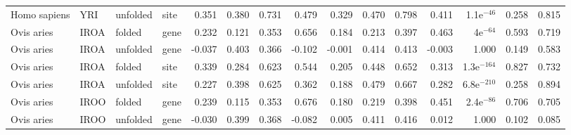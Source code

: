 \begin{longtable}{llllrrrrrrrrrrr}
        Homo sapiens &                       YRI &  unfolded &  site &                              0.351 &                               0.380 &                 0.731 &                 0.479 &                              0.329 &                               0.470 &                 0.798 &                 0.411 &  1.1e$^{-46}$ &  0.258 &  0.815 \\
          Ovis aries &                      IROA &    folded &  gene &                              0.232 &                               0.121 &                 0.353 &                 0.656 &                              0.184 &                               0.213 &                 0.397 &                 0.463 &    4e$^{-64}$ &  0.593 &  0.719 \\
          Ovis aries &                      IROA &  unfolded &  gene &                             -0.037 &                               0.403 &                 0.366 &                -0.102 &                             -0.001 &                               0.414 &                 0.413 &                -0.003 &         1.000 &  0.149 &  0.583 \\
          Ovis aries &                      IROA &    folded &  site &                              0.339 &                               0.284 &                 0.623 &                 0.544 &                              0.205 &                               0.448 &                 0.652 &                 0.313 & 1.3e$^{-164}$ &  0.827 &  0.732 \\
          Ovis aries &                      IROA &  unfolded &  site &                              0.227 &                               0.398 &                 0.625 &                 0.362 &                              0.188 &                               0.479 &                 0.667 &                 0.282 & 6.8e$^{-210}$ &  0.258 &  0.894 \\
          Ovis aries &                      IROO &    folded &  gene &                              0.239 &                               0.115 &                 0.353 &                 0.676 &                              0.180 &                               0.219 &                 0.398 &                 0.451 &  2.4e$^{-86}$ &  0.706 &  0.705 \\
          Ovis aries &                      IROO &  unfolded &  gene &                             -0.030 &                               0.399 &                 0.368 &                -0.082 &                              0.005 &                               0.411 &                 0.416 &                 0.012 &         1.000 &  0.102 &  0.085 \\

\end{longtable}
